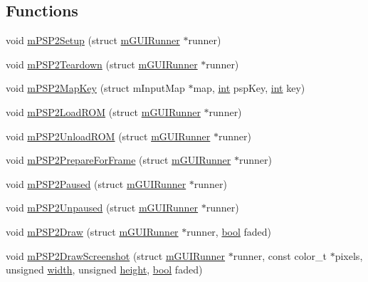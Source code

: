 \subsection*{Functions}
\begin{DoxyCompactItemize}
\item 
void \mbox{\hyperlink{psp2-context_8h_a421c14012a9792c249822f943155921a}{m\+P\+S\+P2\+Setup}} (struct \mbox{\hyperlink{structm_g_u_i_runner}{m\+G\+U\+I\+Runner}} $\ast$runner)
\item 
void \mbox{\hyperlink{psp2-context_8h_aaae5f4b3a42c091f809836cec74d1cd7}{m\+P\+S\+P2\+Teardown}} (struct \mbox{\hyperlink{structm_g_u_i_runner}{m\+G\+U\+I\+Runner}} $\ast$runner)
\item 
void \mbox{\hyperlink{psp2-context_8h_a0ff9569feeb9a2f318792b681331c9ab}{m\+P\+S\+P2\+Map\+Key}} (struct m\+Input\+Map $\ast$map, \mbox{\hyperlink{ioapi_8h_a787fa3cf048117ba7123753c1e74fcd6}{int}} psp\+Key, \mbox{\hyperlink{ioapi_8h_a787fa3cf048117ba7123753c1e74fcd6}{int}} key)
\item 
void \mbox{\hyperlink{psp2-context_8h_a6d1428d32dd856760fa94b6a08e54ab2}{m\+P\+S\+P2\+Load\+R\+OM}} (struct \mbox{\hyperlink{structm_g_u_i_runner}{m\+G\+U\+I\+Runner}} $\ast$runner)
\item 
void \mbox{\hyperlink{psp2-context_8h_a94ad5d2964da6bad167ee85e5f021421}{m\+P\+S\+P2\+Unload\+R\+OM}} (struct \mbox{\hyperlink{structm_g_u_i_runner}{m\+G\+U\+I\+Runner}} $\ast$runner)
\item 
void \mbox{\hyperlink{psp2-context_8h_a0297c6f8d15a9f0b20d14944e45bbac8}{m\+P\+S\+P2\+Prepare\+For\+Frame}} (struct \mbox{\hyperlink{structm_g_u_i_runner}{m\+G\+U\+I\+Runner}} $\ast$runner)
\item 
void \mbox{\hyperlink{psp2-context_8h_a7f9c754e1ebf551ba6e39e76d7135f91}{m\+P\+S\+P2\+Paused}} (struct \mbox{\hyperlink{structm_g_u_i_runner}{m\+G\+U\+I\+Runner}} $\ast$runner)
\item 
void \mbox{\hyperlink{psp2-context_8h_a02416ce4a85e3b948b2a1df34d901cb3}{m\+P\+S\+P2\+Unpaused}} (struct \mbox{\hyperlink{structm_g_u_i_runner}{m\+G\+U\+I\+Runner}} $\ast$runner)
\item 
void \mbox{\hyperlink{psp2-context_8h_ac47f4c33aec2cd84a2236b2686d1ffbe}{m\+P\+S\+P2\+Draw}} (struct \mbox{\hyperlink{structm_g_u_i_runner}{m\+G\+U\+I\+Runner}} $\ast$runner, \mbox{\hyperlink{libretro_8h_a4a26dcae73fb7e1528214a068aca317e}{bool}} faded)
\item 
void \mbox{\hyperlink{psp2-context_8h_a7d85f67c011584f65517082fd5e501bd}{m\+P\+S\+P2\+Draw\+Screenshot}} (struct \mbox{\hyperlink{structm_g_u_i_runner}{m\+G\+U\+I\+Runner}} $\ast$runner, const color\+\_\+t $\ast$pixels, unsigned \mbox{\hyperlink{readppm_8c_a59b7c57bf1dc7c36ac7c8232cf5bb713}{width}}, unsigned \mbox{\hyperlink{readppm_8c_ac8b624a7354198da45f5797b93b883c9}{height}}, \mbox{\hyperlink{libretro_8h_a4a26dcae73fb7e1528214a068aca317e}{bool}} faded)

\end{DoxyCompactItemize}
